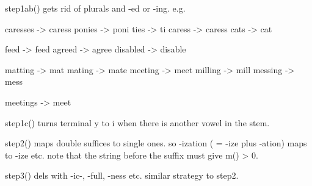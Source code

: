 \documentclass[letterpaper,10pt,english]{sphinxmanual}
\begin{document}
\begin{fulllineitems}
\begin{fulllineitems}
\end{fulllineitems}


\begin{fulllineitems}
\label{\detokenize{porter:porter.PorterStemmer.step1ab}}
step1ab() gets rid of plurals and -ed or -ing. e.g.

caresses  -\textgreater{}  caress
ponies    -\textgreater{}  poni
ties      -\textgreater{}  ti
caress    -\textgreater{}  caress
cats      -\textgreater{}  cat

feed      -\textgreater{}  feed
agreed    -\textgreater{}  agree
disabled  -\textgreater{}  disable

matting   -\textgreater{}  mat
mating    -\textgreater{}  mate
meeting   -\textgreater{}  meet
milling   -\textgreater{}  mill
messing   -\textgreater{}  mess

meetings  -\textgreater{}  meet

\end{fulllineitems}


\begin{fulllineitems}
\label{\detokenize{porter:porter.PorterStemmer.step1c}}
step1c() turns terminal y to i when there is another vowel in the stem.

\end{fulllineitems}


\begin{fulllineitems}
\label{\detokenize{porter:porter.PorterStemmer.step2}}
step2() maps double suffices to single ones.
so -ization ( = -ize plus -ation) maps to -ize etc. note that the
string before the suffix must give m() \textgreater{} 0.

\end{fulllineitems}


\begin{fulllineitems}
\label{\detokenize{porter:porter.PorterStemmer.step3}}
step3() dels with -ic-, -full, -ness etc. similar strategy to step2.


\end{fulllineitems}
\end{fulllineitems}
\end{document}
